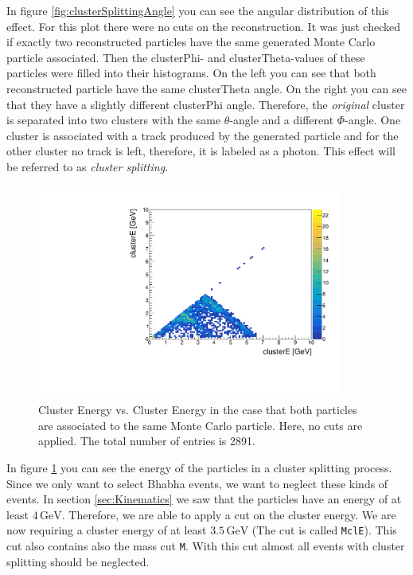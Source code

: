 \documentclass[a4paper,11pt,twosided,final,german,openbib,pdftex,listof=totoc,bibliography=totoc]{scrbook}
\begin{document}
In figure \ref{fig:clusterSplittingAngle} you can see the angular distribution of this effect. For this plot there were no cuts on the reconstruction. It was just checked if exactly two reconstructed particles have the same generated Monte Carlo particle associated. Then the clusterPhi- and clusterTheta-values of these particles were filled into their histograms. On the left you can see that both reconstructed particle have the same clusterTheta angle. On the right you can see that they have a slightly different clusterPhi angle. Therefore, the \textit{original} cluster  is separated into two clusters with the same $\theta$-angle and a different $\Phi$-angle. One cluster is associated with a track produced by the generated particle and for the other cluster no track is left, therefore, it is labeled as a photon. This effect will be referred to as \textit{cluster splitting}.


\begin{figure}[h!]
	\centering
	\includegraphics[width=10cm]{AnhangPlots/EEdoubleMCE}
	\caption[Cluster Splitting Energy Distribution]{Cluster Energy vs. Cluster Energy in the case that both particles are associated to the same Monte Carlo particle. Here, no cuts are applied. The total number of entries is 2891.}
	\label{fig:clusterSplittingE}
\end{figure}

In figure \ref{fig:clusterSplittingE} you can see the energy of the particles in a cluster splitting process. Since we only want to select Bhabha events, we want to neglect these kinds of events. In section \ref{sec:Kinematics} we saw that the particles have an energy of at least $4\,\textrm{GeV}$. Therefore, we are able to apply a cut on the cluster energy. We are now requiring a cluster energy of at least $3.5\,\textrm{GeV}$ (The cut is called \texttt{MclE}). This cut also contains also the mass cut \texttt{M}. With this cut almost all events with cluster splitting should be neglected.
\end{document}
